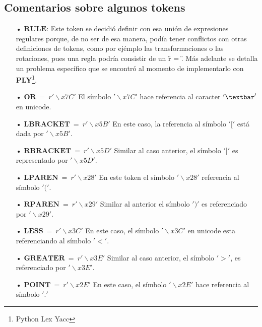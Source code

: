 \subsection{Comentarios sobre algunos tokens}
\begin{itemize}
\item[•] $\mathbf{RULE}$: Este token se decidi\'o definir con esa uni\'on de expresiones regulares porque, de no ser de esa manera, pod\'ia tener conflictos con otras definiciones de tokens, como por ej\'emplo las transformaciones o las rotaciones, pues una regla podr\'ia consistir de un \" r = \". M\'as adelante se detalla un problema espec\'ifico que se encontr\'o al momento de implementarlo con \textbf{PLY}\footnote{Python Lex Yacc}. 

\item[•] $\mathbf{OR}\ =\ r'\backslash x7C'$ El s\'imbolo $'\backslash x7C'$ hace referencia al caracter $' \textbar '$ en unicode.
\item[•] $\mathbf{LBRACKET}\ =\ r'\backslash x5B'$ En este caso, la referencia al s\'imbolo $'['$ est\'a dada por $'\backslash x5B'$. 
\item[•] $\mathbf{RBRACKET}\ =\ r'\backslash x5D'$ Similar al caso anterior, el s\'imbolo $']'$ es representado por $'\backslash x5D'$.
\item[•] $\mathbf{LPAREN}\ =\ r'\backslash x28'$ En este token el s\'imbolo $'\backslash x28'$ referencia al s\'imbolo $'('$. 
\item[•] $\mathbf{RPAREN}\ =\ r'\backslash x29'$ Similar al anterior el s\'imbolo $')'$ es referenciado por $'\backslash x29'$. 
\item[•] $\mathbf{LESS}\ =\ r'\backslash x3C'$ En este caso, el s\'imbolo $'\backslash x3C'$ en unicode esta referenciando al s\'imbolo $'<'$. 
\item[•] $\mathbf{GREATER}\ =\ r'\backslash x3E'$ Similar al caso anterior, el s\'imbolo $'>'$, es referenciado por $'\backslash x3E'$.
\item[•] $\mathbf{POINT}\ =\ r'\backslash x2E'$ En este caso, el s\'imbolo $'\backslash x2E'$ hace referencia al s\'imbolo $'.'$

\end{itemize}
